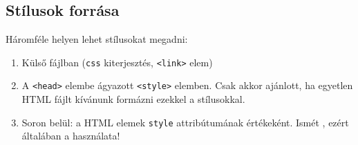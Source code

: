 \subsection{Stílusok forrása}

\begin{frame}
  Háromféle helyen lehet stílusokat megadni:
  \begin{enumerate}
    \item Külső fájlban (\texttt{css} kiterjesztés, \texttt{<link>} elem)
    \item A \texttt{<head>} elembe ágyazott \texttt{<style>} elemben. Csak akkor ajánlott, ha egyetlen HTML fájlt kívánunk formázni ezekkel a stílusokkal.
    \item Soron belül: a HTML elemek \texttt{style} attribútumának értékeként. Ismét , ezért általában  a használata!
  \end{enumerate}
\end{frame}

\begin{frame}
  \begin{exampleblock}{}
    \footnotesize
    
    
  \end{exampleblock}
\end{frame}
